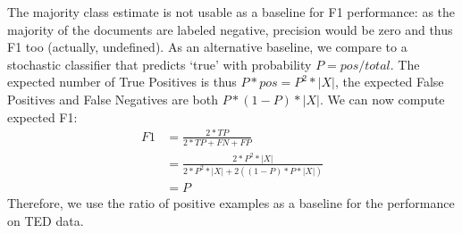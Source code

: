 The majority class estimate is not usable as a baseline for F1 performance: as the majority of the documents are labeled negative, precision would be zero and thus F1 too (actually, undefined). As an alternative baseline, we compare to a stochastic classifier that predicts `true' with probability $P=pos/total$. The expected number of True Positives is thus $P*pos=P^2*|X|$, the expected False Positives and False Negatives are both $P*(1-P)*|X|$. We can now compute expected F1:
\begin{align*}
F1	&=\frac{2*TP}{2*TP+FN+FP}\\
			&=\frac{2*P^2*|X|}{2*P^2*|X|+2((1-P)*P*|X|)}\\
			&=P
\end{align*} Therefore, we use the ratio of positive examples as a baseline for the performance on TED data.







